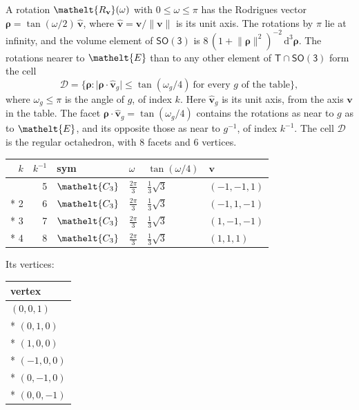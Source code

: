 \documentclass[10pt,a4paper]{article}
\numberwithin{equation}{section}
\newcommand{\eltfont}[1]{{\let\sigma\eltsigma\mathelt{#1}}}
\newcommand{\grp}[1]{\mathsf{#1}}
\newcommand{\cls}[1]{\eltfont{#1}}
\newcommand{\elt}[1]{\eltfont{#1}}
\newcommand{\dirvec}[3]{(#1, #2, #3)}
\newcommand{\unitaxis}{\hat{\mathbf{v}}}
\newcommand{\vv}{\mathbf{v}}
\newcommand{\diff}{\mathrm{d}}
\newcommand{\rodrigues}{\boldsymbol{\rho}}
\newcommand{\fcell}{\mathcal{D}}
\begin{document}
\leavevmode\label{n:vector.rodrigues}\label{n:vector.unitaxis}A rotation $\elt{R_{\vv}}(\omega)$ with $0 \le \omega \le \pi$ has the Rodrigues vector $\rodrigues = \tan(\omega/2)\,\unitaxis$, where $\unitaxis = \vv/\lVert\vv\rVert$ is its unit axis. The rotations by $\pi$ lie at infinity, and the volume element of \href{SO3.pdf}{$\grp{SO(3)}$} is $8\,(1 + \lVert\rodrigues\rVert^2)^{-2}\,\diff^3\rodrigues$.
\leavevmode\label{n:set.cell}The rotations nearer to $\elt{E}$ than to any other element of $\grp{T} \cap \grp{SO(3)}$ form the cell
\begin{equation}\label{e:cell}\fcell = \bigl\{\rodrigues : \lvert\rodrigues\cdot\unitaxis_g\rvert \le \tan(\omega_g/4)\ \text{for every $g$ of the table}\bigr\},\end{equation}
where $\omega_g \le \pi$ is the angle of $g$, of index $k$. Here $\unitaxis_g$ is its unit axis, from the axis $\vv$ in the table. The facet $\rodrigues\cdot\unitaxis_g = \tan(\omega_g/4)$ contains the rotations as near to $g$ as to $\elt{E}$, and its opposite those as near to $g^{-1}$, of index $k^{-1}$. The cell $\fcell$ is the regular octahedron, with 8 facets and 6 vertices.
{\small{\renewcommand{\arraystretch}{1.3}\begin{longtable}{@{}rrllll@{}}\toprule
$k$ & $k^{-1}$ & sym & $\omega$ & $\tan(\omega/4)$ & $\vv$\\\midrule\endhead
\bottomrule\endfoot\endlastfoot
1 & 5 & $\cls{C_{3}}$ & $\tfrac{2\pi}{3}$ & $\tfrac{1}{3}\sqrt{3}$ & $\dirvec{-1}{-1}{1}$\\*
2 & 6 & $\cls{C_{3}}$ & $\tfrac{2\pi}{3}$ & $\tfrac{1}{3}\sqrt{3}$ & $\dirvec{-1}{1}{-1}$\\*
3 & 7 & $\cls{C_{3}}$ & $\tfrac{2\pi}{3}$ & $\tfrac{1}{3}\sqrt{3}$ & $\dirvec{1}{-1}{-1}$\\*
4 & 8 & $\cls{C_{3}}$ & $\tfrac{2\pi}{3}$ & $\tfrac{1}{3}\sqrt{3}$ & $\dirvec{1}{1}{1}$\\
\bottomrule\end{longtable}}}
\leavevmode\label{n:head.vertex}Its vertices:
{\small\begin{longtable}{@{}l@{}}\toprule
vertex\\\midrule\endhead
\bottomrule\endfoot\endlastfoot
$(0, 0, 1)$\\*
$(0, 1, 0)$\\*
$(1, 0, 0)$\\*
$(-1, 0, 0)$\\*
$(0, -1, 0)$\\*
$(0, 0, -1)$\\
\bottomrule\end{longtable}}
\end{document}
